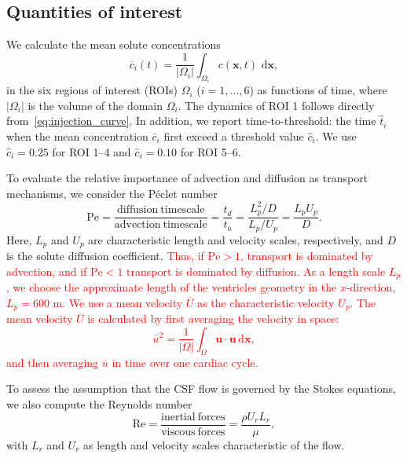 \documentclass[fleqn]{wlscirep}
\newcommand{\cbar}{\overline{c}}
\newcommand{\dx}{\, \mathrm d\bm{x}}
\newcommand{\uu}{\mathbf{u}}
\newcommand{\xx}{\bm{x}}
\newcommand{\fixme}[1]{\textcolor{red}{#1}}
\begin{document}
\subsection*{Quantities of interest}
We calculate the mean solute concentrations
\begin{equation}
    \cbar_i(t) = \frac{1}{|\Omega_i|}\int_{\Omega_i} c(\xx, t)\,\dx,
    \label{eq:c_mean_i}
\end{equation}
in the six regions of interest (ROIs) $\Omega_i$ ($i = 1, \dots, 6$) as functions of time, where $|\Omega_i|$ is the volume of the domain $\Omega_i$. The dynamics of ROI 1 follows directly from~\eqref{eq:injection_curve}. In addition, we report time-to-threshold: the time $\hat{t}_i$ when the mean concentration $\cbar_i$ first exceed a threshold value $\hat{c}_i$. We use $\hat{c}_i=0.25$ for ROI 1--4 and $\hat{c}_i=0.10$ for ROI 5--6.

To evaluate the relative importance of advection and diffusion as transport mechanisms, we consider the Péclet number
\begin{equation*}
    \mathrm{Pe} = \frac{\mathrm{diffusion \ timescale}}{\mathrm{advection \ timescale}} = \frac{t_d}{t_a} = \frac{L_p^2/D}{L_p/U_p} = \frac{L_p U_p}{D}.
\end{equation*}
Here, $L_p$ and $U_p$ are characteristic length and velocity scales, respectively, and $D$ is the solute diffusion coefficient. \fixme{Thus, if $\mathrm{Pe} > 1$, transport is dominated by advection, and if $\mathrm{Pe} < 1$ transport is dominated by diffusion. As a length scale $L_p$, we choose the approximate length of the ventricles geometry in the $x$-direction, $L_p=600$ \textmu m. We use a mean velocity $\overline{U}$ as the characteristic velocity $U_p$. The mean velocity $\overline{U}$ is calculated by first averaging the velocity in space:
\begin{equation*}
    \overline{u}^2 = \frac{1}{|\Omega|}\int_{\Omega}\uu\cdot\uu\dx,
\end{equation*}
and then averaging $\overline{u}$ in time over one cardiac cycle.}

To assess the assumption that the CSF flow is governed by the Stokes equations, we also compute the Reynolds number
\begin{equation*}
    \mathrm{Re} = \frac{\mathrm{inertial \ forces}}{\mathrm{viscous \ forces}} = \frac{\rho U_r L_r}{\mu},
\end{equation*}
with $L_r$ and $U_r$ as length and velocity scales characteristic of the flow. 
\end{document}
